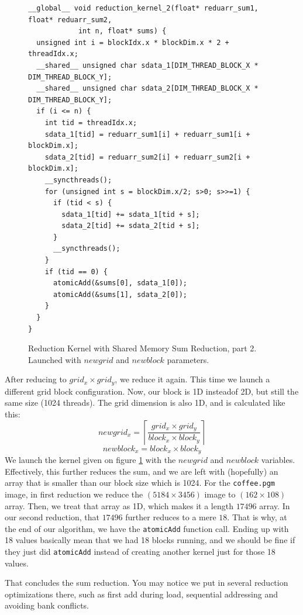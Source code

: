 \documentclass[12pt,reqno]{amsart}
\newcommand{\code}[1]{\texttt{#1}}
\begin{document}
\begin{figure}[h]
\centering
\begin{lstlisting}
__global__ void reduction_kernel_2(float* reduarr_sum1, float* reduarr_sum2, 
			int n, float* sums) {
  unsigned int i = blockIdx.x * blockDim.x * 2 + threadIdx.x;
  __shared__ unsigned char sdata_1[DIM_THREAD_BLOCK_X * DIM_THREAD_BLOCK_Y];
  __shared__ unsigned char sdata_2[DIM_THREAD_BLOCK_X * DIM_THREAD_BLOCK_Y]; 
  if (i <= n) {
	int tid = threadIdx.x; 
	sdata_1[tid] = reduarr_sum1[i] + reduarr_sum1[i + blockDim.x];
	sdata_2[tid] = reduarr_sum2[i] + reduarr_sum2[i + blockDim.x]; 
	__syncthreads();
	for (unsigned int s = blockDim.x/2; s>0; s>>=1) {
	  if (tid < s) { 
		sdata_1[tid] += sdata_1[tid + s]; 
		sdata_2[tid] += sdata_2[tid + s];
	  }
	  __syncthreads();
	}
	if (tid == 0) {
	  atomicAdd(&sums[0], sdata_1[0]);
	  atomicAdd(&sums[1], sdata_2[0]);
	}
  }		
}
\end{lstlisting}
\caption{Reduction Kernel with Shared Memory Sum Reduction, part 2. Launched with $newgrid$ and $newblock$ parameters.}
\label{fig:reduc_2}
\end{figure}
 
 After reducing to $grid_x \times grid_y$, we reduce it again. This time we launch a different grid block configuration. Now, our block is 1D insteadof 2D, but still the same size (1024 threads). The grid dimension is also 1D, and is calculated like this:
 $$
 newgrid_x = \left\lceil \frac{grid_x \times grid_y}{block_x \times block_y}\right\rceil
 $$
 $$
 newblock_x = block_x \times block_y
 $$
 We launch the kernel given on figure \ref{fig:reduc_2} with the $newgrid$ and $newblock$ variables. Effectively, this further reduces the sum, and we are left with (hopefully) an array that is smaller than our block size which is 1024. 
 For the \code{coffee.pgm} image, in first reduction we reduce the $(5184 \times 3456)$ image to $(162\times108)$ array. Then, we treat that array as 1D, which makes it a length $17496$ array. In our second reduction, that $17496$ further reduces to a mere $18$. That is why, at the end of our algorithm, we have the \code{atomicAdd} function call. Ending up with 18 values basically mean that we had 18 blocks running, and we should be fine if they just did \code{atomicAdd} instead of creating another kernel just for those 18 values. 
 
That concludes the sum reduction. You may notice we put in several reduction optimizations there, such as first add during load, sequential addressing and avoiding bank conflicts.
\end{document}
